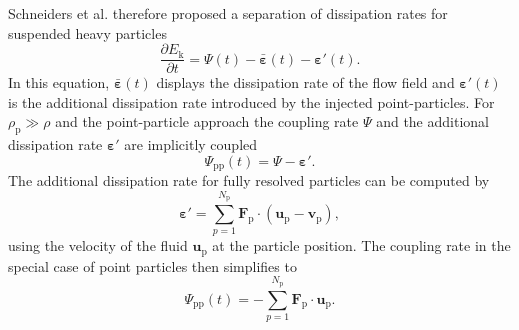 \documentclass[11pt,a4paper,openany,oneside,parskip=half*]{article}
\renewcommand*\vec[1]{\boldsymbol{#1}}
\begin{document}
Schneiders et al. \cite{schneiders2017} therefore proposed a separation of dissipation rates for suspended heavy particles
\begin{equation}
\frac{\partial E_\mathrm{k}}{\partial t} = \Psi (t) - \vec{\bar{\varepsilon}} (t) - \vec{\varepsilon}' (t).
\end{equation}
In this equation, $\vec{\bar{\varepsilon}} (t)$ displays the dissipation rate of the flow field and $\vec{\varepsilon}' (t)$ is the additional dissipation rate introduced by the injected point-particles. For $\rho_\mathrm{p} \gg \rho$ and the point-particle approach the coupling rate $\Psi$ and the additional dissipation rate $\vec{\varepsilon}'$ are implicitly coupled
\begin{equation}
\Psi_\mathrm{pp} (t) = \Psi -\vec{\varepsilon}'.
\end{equation}
The additional dissipation rate for fully resolved particles can be computed by
\begin{equation}
	\vec{\varepsilon}' = \sum_{p=1}^{N_\mathrm{p}} \vec{F}_\mathrm{p} \cdot (\vec{u}_\mathrm{p}-\vec{v}_\mathrm{p}),
\end{equation}
using the velocity of the fluid $\vec{u}_\mathrm{p}$ at the particle position.
The coupling rate in the special case of point particles then simplifies to 
\begin{equation}
\Psi_\mathrm{pp} (t) = - \sum_{p=1}^{N_\mathrm{p}} \vec{F}_\mathrm{p} \cdot \vec{u}_\mathrm{p}.
\end{equation}
\newline
\end{document}
